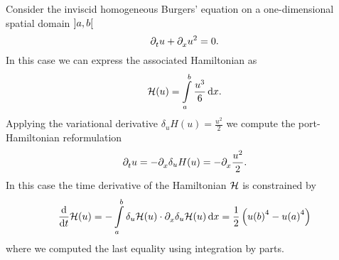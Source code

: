 \begin{example}\label{ex:burgers}
    Consider the inviscid homogeneous Burgers' equation on a one-dimensional spatial domain $\interval[open]{a}{b}$
    \begin{equation*}
        \pd[t]{} u + \pd[x]{} u^2 = 0.
    \end{equation*}
    In this case we can express the associated Hamiltonian as
    \begin{equation*}
        \mcl{H}(u) = \int\limits_a^b \frac{u^3}{6} \dif x.
    \end{equation*}
    Applying the variational derivative $\delta_u H(u) = \frac{u^2}{2}$ we compute the port-Hamiltonian reformulation
    \begin{equation*}
        \pd[t]{} u = - \pd{} \delta_u H(u) = -\pd{} \frac{u^2}{2}.
    \end{equation*}
    In this case the time derivative of the Hamiltonian $\mcl{H}$ is constrained by
    \begin{equation*}
        \frac{\dif}{\dif t} \mcl{H}(u) = - \int\limits_a^b \delta_u \mcl{H}(u) \cdot \pd{} \delta_u \mcl{H}(u) \dif x = \frac{1}{2} \left( {u(b)}^4 - {u(a)}^4 \right)
    \end{equation*}
    where we computed the last equality using integration by parts.
\end{example}

